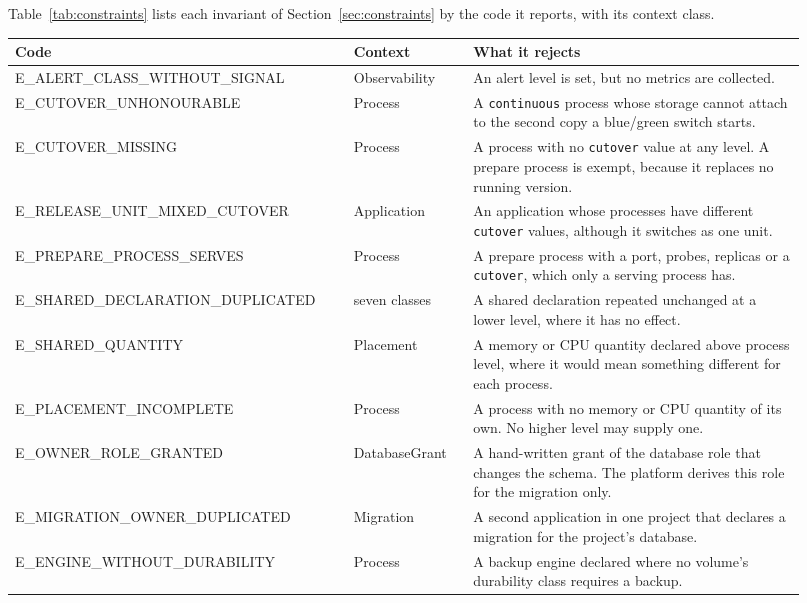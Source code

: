 Table~\ref{tab:constraints} lists each invariant of
Section~\ref{sec:constraints} by the code it reports, with its context class.

\begin{table}[H]
\centering
\footnotesize
\renewcommand{\arraystretch}{0.8}
\begin{tabular}{>{\raggedright\arraybackslash}p{0.39\linewidth}>{\raggedright\arraybackslash}p{0.14\linewidth}>{\raggedright\arraybackslash}p{0.39\linewidth}}
\hline
\textbf{Code} & \textbf{Context} & \textbf{What it rejects} \\
\hline
E\_ALERT\_CLASS\_WITHOUT\_SIGNAL & Observability & An alert level is set, but no metrics are collected. \\
E\_CUTOVER\_UNHONOURABLE & Process & A \texttt{continuous} process whose storage cannot attach to the second copy a blue/green switch starts. \\
E\_CUTOVER\_MISSING & Process & A process with no \texttt{cutover} value at any level. A prepare process is exempt, because it replaces no running version. \\
E\_RELEASE\_UNIT\_MIXED\_CUTOVER & Application & An application whose processes have different \texttt{cutover} values, although it switches as one unit. \\
E\_PREPARE\_PROCESS\_SERVES & Process & A prepare process with a port, probes, replicas or a \texttt{cutover}, which only a serving process has. \\
E\_SHARED\_DECLARATION\_DUPLICATED & seven classes & A shared declaration repeated unchanged at a lower level, where it has no effect. \\
E\_SHARED\_QUANTITY & Placement & A memory or CPU quantity declared above process level, where it would mean something different for each process. \\
E\_PLACEMENT\_INCOMPLETE & Process & A process with no memory or CPU quantity of its own. No higher level may supply one. \\
E\_OWNER\_ROLE\_GRANTED & DatabaseGrant & A hand-written grant of the database role that changes the schema. The platform derives this role for the migration only. \\
E\_MIGRATION\_OWNER\_DUPLICATED & Migration & A second application in one project that declares a migration for the project's database. \\
E\_ENGINE\_WITHOUT\_DURABILITY & Process & A backup engine declared where no volume's durability class requires a backup. \\

\end{tabular}
\end{table}
